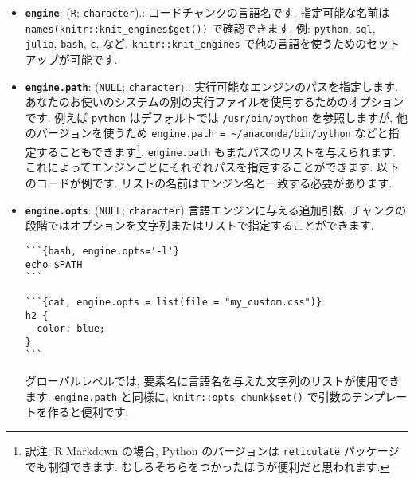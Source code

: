 \documentclass[
  11pt,
  lualatex,ja=standard,jafont=noto]{bxjsreport}
\newenvironment{Shaded}{\begin{snugshade}}{\end{snugshade}}
\newcommand{\AttributeTok}[1]{\textcolor[rgb]{0.77,0.63,0.00}{#1}}
\newcommand{\FunctionTok}[1]{\textcolor[rgb]{0.00,0.00,0.00}{#1}}
\newcommand{\NormalTok}[1]{#1}
\newcommand{\SpecialCharTok}[1]{\textcolor[rgb]{0.00,0.00,0.00}{#1}}
\newcommand{\StringTok}[1]{\textcolor[rgb]{0.31,0.60,0.02}{#1}}
\begin{document}
\begin{itemize}
\item
  \textbf{\texttt{engine}}: (\texttt{\textquotesingle{}R\textquotesingle{}}; \texttt{character}).: コードチャンクの言語名です. 指定可能な名前は \texttt{names(knitr::knit\_engines\$get())} で確認できます. 例: \texttt{python}, \texttt{sql}, \texttt{julia}, \texttt{bash}, \texttt{c}, など. \texttt{knitr::knit\_engines} で他の言語を使うためのセットアップが可能です.
\item
  \textbf{\texttt{engine.path}}: (\texttt{NULL}; \texttt{character}).: 実行可能なエンジンのパスを指定します. あなたのお使いのシステムの別の実行ファイルを使用するためのオプションです. 例えば \texttt{python} はデフォルトでは \texttt{/usr/bin/python} を参照しますが, 他のバージョンを使うため \texttt{engine.path = \textquotesingle{}\textasciitilde{}/anaconda/bin/python\textquotesingle{}} などと指定することもできます\footnote{訳注: R Markdown の場合, Python のバージョンは \texttt{reticulate} パッケージでも制御できます. むしろそちらをつかったほうが便利だと思われます.}. \texttt{engine.path} もまたパスのリストを与えられます. これによってエンジンごとにそれぞれパスを指定することができます. 以下のコードが例です. リストの名前はエンジン名と一致する必要があります.

\begin{Shaded}
\end{Shaded}
\item
  \textbf{\texttt{engine.opts}}: (\texttt{NULL}; \texttt{character}) 言語エンジンに与える追加引数. チャンクの段階ではオプションを文字列またはリストで指定することができます.

\begin{verbatim}
```{bash, engine.opts='-l'}
echo $PATH
```
\end{verbatim}

\begin{verbatim}
```{cat, engine.opts = list(file = "my_custom.css")}
h2 {
  color: blue;
}
```
\end{verbatim}

  グローバルレベルでは, 要素名に言語名を与えた文字列のリストが使用できます. \texttt{engine.path} と同様に, \texttt{knitr::opts\_chunk\$set()} で引数のテンプレートを作ると便利です.


\end{itemize}
\end{document}
